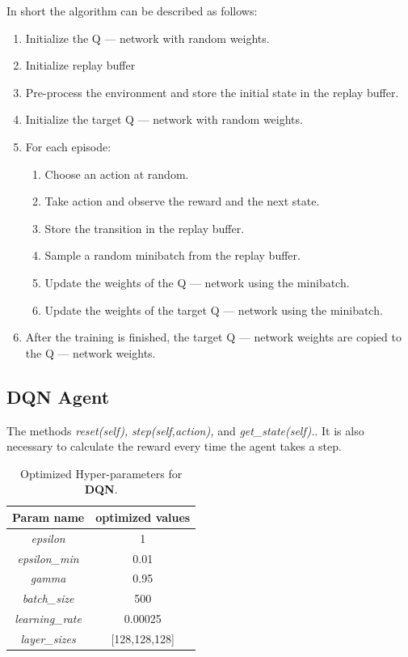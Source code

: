 \documentclass[11pt]{article}
\begin{document}
In short the algorithm can be described as follows:
\begin{enumerate}
    \item Initialize the Q — network with random weights.
    \item Initialize replay buffer
    \item Pre-process the environment and store the initial state in the replay buffer.
    \item Initialize the target Q — network with random weights.
    \item  For each episode:
        \begin{enumerate}
            \item Choose an action at random.
            \item Take action and observe the reward and the next state.
            \item Store the transition in the replay buffer.
            \item Sample a random minibatch from the replay buffer.
            \item Update the weights of the Q — network using the minibatch.
            \item Update the weights of the target Q — network using the minibatch.
        \end{enumerate}
    \item After the training is finished, the target Q — network weights are copied to the Q — network weights.
\end{enumerate}
\subsection{DQN Agent}

The methods \textit{reset(self),} \textit{step(self,action),} and \textit{get\_state(self).}. It is also necessary to calculate the reward every time the agent takes a step.
\begin{table}[ht]
\begin{center}
\begin{tabular}{ | c | c| }
\hline
 Param name & optimized values \\ 
\hline
\textit{epsilon}  & 1 \\  
\textit{epsilon\_min} & 0.01  \\ 
\textit{gamma} & 0.95 \\
\textit{batch\_size} & 500 \\
\textit{learning\_rate} & 0.00025 \\
\textit{layer\_sizes} & [128,128,128] \\
\hline
\end{tabular}
\label{tab:parameter-table}
\caption{Optimized Hyper-parameters for \textbf{DQN}.}
\end{center}

\end{table}
\end{document}
